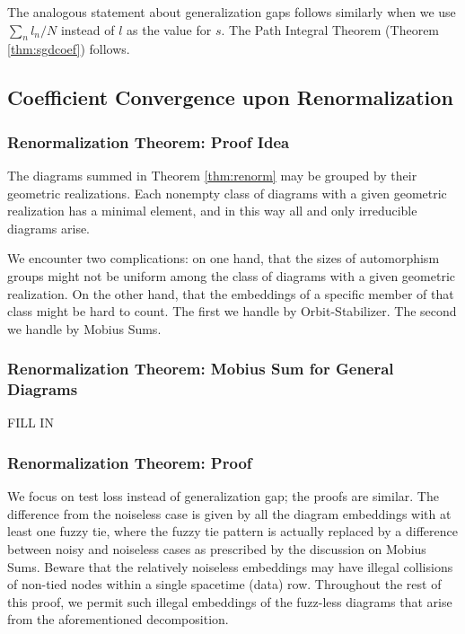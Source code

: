 \documentclass{article}
\begin{document}
            The analogous statement about generalization gaps follows similarly
            when we use $\sum_n l_n/N$ instead of $l$ as the value for $s$. 
            The Path Integral Theorem (Theorem \ref{thm:sgdcoef}) follows.

    \subsection*{Coefficient Convergence upon Renormalization}
        \subsubsection*{Renormalization Theorem: Proof Idea}
            The diagrams summed in Theorem \ref{thm:renorm} may be grouped by
            their geometric realizations.  Each nonempty class of diagrams with
            a given geometric realization has a minimal element, and in this
            way all and only irreducible diagrams arise. 

            We encounter two complications: on one hand, that the sizes of
            automorphism groups might not be uniform among the class of
            diagrams with a given geometric realization.  On the other hand,
            that the embeddings of a specific member of that class might be
            hard to count.  The first we handle by Orbit-Stabilizer.  The
            second we handle by Mobius Sums.

        \subsubsection*{Renormalization Theorem: Mobius Sum for General Diagrams}
            {\color{moor} FILL IN}
            
        \subsubsection*{Renormalization Theorem: Proof}
            We focus on test loss instead of generalization gap; the proofs are
            similar. The
            difference from the noiseless case is given by all the diagram
            embeddings with at least one fuzzy tie, where the fuzzy tie pattern
            is actually replaced by a difference between noisy and noiseless
            cases as prescribed by the discussion on Mobius Sums.
            Beware that the relatively noiseless embeddings may have illegal
            collisions of non-tied nodes within a single spacetime (data) row.
            Throughout the rest of this proof, we permit such illegal
            embeddings of the fuzz-less diagrams that arise from the
            aforementioned decomposition.  
\end{document}
